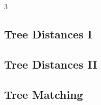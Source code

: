\documentclass[8pt]{extarticle}
\begin{document}
\begin{multicols*}{3}
\subsection{Tree Distances I}
\begin{caixaenunciado}

\end{caixaenunciado}
\vspace{0.3cm}


\subsection{Tree Distances II}
\begin{caixaenunciado}

\end{caixaenunciado}
\vspace{0.3cm}


\subsection{Tree Matching}
\begin{caixaenunciado}

\end{caixaenunciado}
\vspace{0.3cm}

\end{multicols*}
\pagebreak
\end{document}
